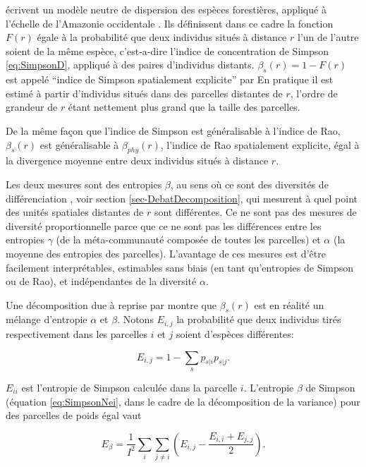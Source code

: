 \documentclass[
  11pt,
  french,
  a4paper,
  extrafontsizes,onecolumn,openright
  ]{memoir}
\begin{document}
\textcite{Chave2002} écrivent un modèle neutre de dispersion des espèces forestières, appliqué à l'échelle de l'Amazonie occidentale \autocite{Condit2002}.
Ils définissent dans ce cadre la fonction \(F(r)\) égale à la probabilité que deux individus situés à distance \(r\) l'un de l'autre soient de la même espèce, c'est-a-dire l'indice de concentration de Simpson \eqref{eq:SimpsonD}, appliqué à des paires d'individus distants.
\(\beta_s(r)=1-F(r)\) est appelé ``indice de Simpson spatialement explicite'' par \textcite{Shen2013}
En pratique il est estimé à partir d'individus situés dans des parcelles distantes de \(r\), l'ordre de grandeur de \(r\) étant nettement plus grand que la taille des parcelles.

De la même façon que l'indice de Simpson est généralisable à l'indice de Rao, \(\beta_s(r)\) est généralisable à \(\beta_{phy}(r)\), l'indice de Rao spatialement explicite, égal à la divergence moyenne entre deux individus situés à distance \(r\).

Les deux mesures sont des entropies \(\beta\), au sens où ce sont des diversités de différenciation \autocite{Jurasinski2009}, voir section \ref{sec-DebatDecomposition}, qui mesurent à quel point des unités spatiales distantes de \(r\) sont différentes.
Ce ne sont pas des mesures de diversité proportionnelle parce que ce ne sont pas les différences entre les entropies \(\gamma\) (de la méta-communauté composée de toutes les parcelles) et \(\alpha\) (la moyenne des entropies des parcelles).
L'avantage de ces mesures est d'être facilement interprétables, estimables sans biais (en tant qu'entropies de Simpson ou de Rao), et indépendantes de la diversité \(\alpha\).

Une décomposition due à \textcite{Nei1973} reprise par \textcite{Chave2007} montre que \(\beta_s(r)\) est en réalité un mélange d'entropie \(\alpha\) et \(\beta\).
Notons \(E_{i,j}\) la probabilité que deux individus tirés respectivement dans les parcelles \(i\) et \(j\) soient d'espèces différentes:

\begin{equation}
  \label{eq:Nei1973}
  E_{i,j} = 1-\sum_{s}{p_{s|i}}{p_{s|j}}.
\end{equation}

\(E_{ii}\) est l'entropie de Simpson calculée dans la parcelle \(i\).
L'entropie \(\beta\) de Simpson (équation \eqref{eq:SimpsonNei}, dans le cadre de la décomposition de la variance) pour des parcelles de poids égal vaut

\begin{equation}
  \label{eq:EbetaNei}
  E_{\beta} = \frac{1}{I^2} \sum_{i}\sum_{j\ne i}\left({E_{i,j}-\frac{E_{i,i}+E_{j,j}}{2}}\right).
\end{equation}
\end{document}
